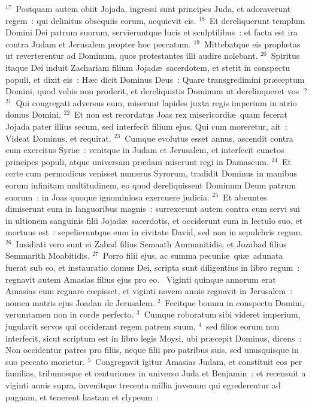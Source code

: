 ${}^{17}$~Postquam autem obiit Jojada, ingressi sunt principes Juda, et adoraverunt regem~: qui delinitus obsequiis eorum, acquievit eis.
${}^{18}$~Et dereliquerunt templum Domini Dei patrum suorum, servieruntque lucis et sculptilibus~: et facta est ira contra Judam et Jerusalem propter hoc peccatum.
${}^{19}$~Mittebatque eis prophetas ut reverterentur ad Dominum, quos protestantes illi audire nolebant.
${}^{20}$~Spiritus itaque Dei induit Zachariam filium Jojad\ae\ sacerdotem, et stetit in conspectu populi, et dixit eis~: H\ae c dicit Dominus Deus~: Quare transgredimini pr\ae ceptum Domini, quod vobis non proderit, et dereliquistis Dominum ut derelinqueret vos~?
${}^{21}$~Qui congregati adversus eum, miserunt lapides juxta regis imperium in atrio domus Domini.
${}^{22}$~Et non est recordatus Joas rex misericordi\ae\ quam fecerat Jojada pater illius secum, sed interfecit filium ejus. Qui cum moreretur, ait~: Videat Dominus, et requirat.
${}^{23}$~Cumque evolutus esset annus, ascendit contra eum exercitus Syri\ae~: venitque in Judam et Jerusalem, et interfecit cunctos principes populi, atque universam pr\ae dam miserunt regi in Damascum.
${}^{24}$~Et certe cum permodicus venisset numerus Syrorum, tradidit Dominus in manibus eorum infinitam multitudinem, eo quod dereliquissent Dominum Deum patrum suorum~: in Joas quoque ignominiosa exercuere judicia.
${}^{25}$~Et abeuntes dimiserunt eum in languoribus magnis~: surrexerunt autem contra eum servi sui in ultionem sanguinis filii Jojad\ae\ sacerdotis, et occiderunt eum in lectulo suo, et mortuus est~: sepelieruntque eum in civitate David, sed non in sepulchris regum.
${}^{26}$~Insidiati vero sunt ei Zabad filius Semaath Ammanitidis, et Jozabad filius Semmarith Moabitidis.
${}^{27}$~Porro filii ejus, ac summa pecuni\ae\ qu\ae\ adunata fuerat sub eo, et instauratio domus Dei, scripta sunt diligentius in libro regum~: regnavit autem Amasias filius ejus pro eo.
~Viginti quinque annorum erat Amasias cum regnare cœpisset, et viginti novem annis regnavit in Jerusalem~: nomen matris ejus Joadan de Jerusalem.
${}^{2}$~Fecitque bonum in conspectu Domini, verumtamen non in corde perfecto.
${}^{3}$~Cumque roboratum sibi videret imperium, jugulavit servos qui occiderant regem patrem suum,
${}^{4}$~sed filios eorum non interfecit, sicut scriptum est in libro legis Moysi, ubi pr\ae cepit Dominus, dicens~: Non occidentur patres pro filiis, neque filii pro patribus suis, sed unusquisque in suo peccato morietur.
${}^{5}$~Congregavit igitur Amasias Judam, et constituit eos per familias, tribunosque et centuriones in universo Juda et Benjamin~: et recensuit a viginti annis supra, invenitque trecenta millia juvenum qui egrederentur ad pugnam, et tenerent hastam et clypeum~:
